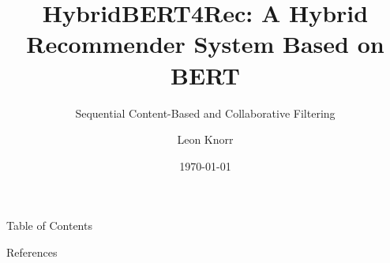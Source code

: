 \documentclass[en]{sdqbeamer}
\title[HybridBERT4Rec]{HybridBERT4Rec: A Hybrid Recommender System Based on BERT}
\subtitle{Sequential Content-Based and Collaborative Filtering}
\author[Leon Knorr]{Leon Knorr}
\date[\today]{\today}
\begin{document}
 
\KITtitleframe

\begin{frame}{Table of Contents}
\tableofcontents
\end{frame}

\appendix
\beginbackup
\begin{frame}{References}
	\printbibliography
\end{frame}

\backupend
\end{document}
